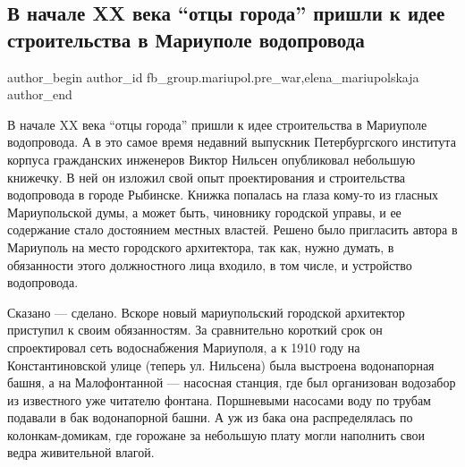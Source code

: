 
 
 
 
 

\subsection{В начале XX века \enquote{отцы города} пришли к идее строительства в Мариуполе водопровода}
\label{sec:27_02_2023.fb.fb_group.mariupol.pre_war.8.vodoprovod_bashnja_nilsen}
 
\ifcmt
 author_begin
   author_id fb_group.mariupol.pre_war,elena_mariupolskaja
 author_end
\fi

В начале XX века \enquote{отцы города} пришли к идее строительства в Мариуполе
водопровода. А в это самое время недавний выпускник Петербургского института
корпуса гражданских инженеров Виктор Нильсен опубликовал небольшую книжечку. В
ней он изложил свой опыт проектирования и строительства водопровода в городе
Рыбинске. Книжка попалась на глаза кому-то из гласных Мариупольской думы, а
может быть, чиновнику городской управы, и ее содержание стало достоянием
местных властей. Решено было пригласить автора в Мариуполь на место городского
архитектора, так как, нужно думать, в обязанности этого должностного лица
входило, в том числе, и устройство водопровода.

Сказано — сделано. Вскоре новый мариупольский городской архитектор приступил к
своим обязанностям. За сравнительно короткий срок он спроектировал сеть
водоснабжения Мариуполя, а к 1910 году на Константиновской улице (теперь ул.
Нильсена) была выстроена водонапорная башня, а на Малофонтанной — насосная
станция, где был организован водозабор из известного уже читателю фонтана.
Поршневыми насосами воду по трубам подавали в бак водонапорной башни. А уж из
бака она распределялась по колонкам-домикам, где горожане за небольшую плату
могли наполнить свои ведра живительной влагой.

